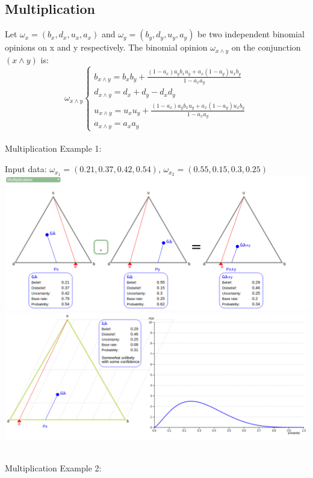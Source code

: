 \documentclass[UTF8]{article}
\newcommand{\opinion}[5]{$\omega_{#1} = (#2, #3, #4, #5)$}
\begin{document}
\subsection{Multiplication}
Let \opinion{x}{b_x}{d_x}{u_x}{a_x} and \opinion{y}{b_y}{d_y}{u_y}{a_y} be two independent binomial opinions on x and y respectively. The binomial opinion $\omega_{x \land y}$ on the conjunction $(x \land y)$ is:
$$
\omega_{x \land y}
\begin{cases}
    b_{x \land y} = b_xb_y+ \frac{(1 - a_x)a_yb_xu_y + a_x(1 - a_y)u_xb_y}{1 - a_xa_y}\\    
    d_{x \land y} = d_x + d_y - d_xd_y\\
    u_{x \land y} = u_xu_y+ \frac{(1 - a_x)a_yb_xu_y + a_x(1 - a_y)u_xb_y}{1 - a_xa_y}\\
    a_{x \land y} = a_xa_y
\end{cases}
$$\\
Multiplication Example 1:\\
\begin{center}
    Input data: 
    \opinion{x_1}{0.21}{0.37}{0.42}{0.54}, 
    \opinion{x_2}{0.55}{0.15}{0.3}{0.25}\\
    \includegraphics[width=6in]{images/mul1.png}
    \includegraphics[width=6in]{images/mul1viz.png}
\end{center}
\hrulefill\\
Multiplication Example 2:
\end{document}
